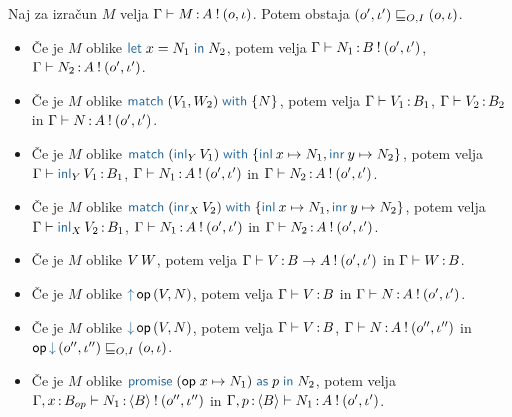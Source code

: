 \begin{lema}\label{lem:inversion-lema}
	Naj za izračun $M$ velja $\Gamma \vdash M \mathinner{:} A \mathbin{!} (o, \iota)$. Potem obstaja $(o', \iota') \sqsubseteq_{O, I} (o, \iota)$.
	\begin{itemize}
		\item Če je $M$ oblike $\tmlet{x}{N_1}{N_2}$, potem velja $\Gamma \vdash N_1 \mathinner{:} B \mathbin{!} (o', \iota')$, $\Gamma \vdash N_2 \mathinner{:} A \mathbin{!} (o', \iota')$.
	
		\item Če je $M$ oblike $\tmmatch{\tmpair{V_1}{W_2}}{N}$, potem velja $\Gamma \vdash V_1 \mathinner{:} B_1$, $\Gamma \vdash V_2 \mathinner{:} B_2$ in $\Gamma \vdash N \mathinner{:} A \mathbin{!} (o', \iota')$.
		
		\item Če je $M$ oblike $\tmmatch{(\tminl[Y]{V_1})}{\tminl{x} \mapsto N_1, \tminr{y} \mapsto N_2}$, potem velja $\Gamma \types \tminl[Y]{V_1} \of B_1$, $\Gamma \vdash N_1 \mathinner{:} A \mathbin{!} (o', \iota')$ in $\Gamma \vdash N_2 \mathinner{:} A \mathbin{!} (o', \iota')$.
		
		\item Če je $M$ oblike $\tmmatch{(\tminr[X]{V_2})}{\tminl{x} \mapsto N_1, \tminr{y} \mapsto N_2}$, potem velja $\Gamma \types \tminl[X]{V_2} \of B_1$, $\Gamma \vdash N_1 \mathinner{:} A \mathbin{!} (o', \iota')$ in $\Gamma \vdash N_2 \mathinner{:} A \mathbin{!} (o', \iota')$.
		
		\item Če je $M$ oblike $V\,W$, potem velja $\Gamma \vdash V \mathinner{:} B \to A \mathbin{!} (o', \iota')$ in $\Gamma \vdash W \mathinner{:} B$.
		
		\item Če je $M$ oblike $\tmopout{op}{V}{N}$, potem velja $\Gamma \vdash V \mathinner{:} B$ in $\Gamma \vdash N \mathinner{:} A \mathbin{!} (o', \iota')$.
		
		\item Če je $M$ oblike $\tmopin{op}{V}{N}$, potem velja $\Gamma \vdash V \mathinner{:} B$, $\Gamma \vdash N \mathinner{:} A \mathbin{!} (o'', \iota'')$ in $\opincomp{op}{(\o'', \i'')} \order{O, I} (\o, \i)$.
		
		\item Če je $M$ oblike $\tmwith{op}{x}{N_1}{p}{N_2}$, potem velja $\Gamma, x \mathinner{:} B_{op} \vdash N_1 \mathinner{:} \langle B \rangle \mathbin{!} (o'', \iota'')$ in $\Gamma, p \mathinner{:} \langle B \rangle \vdash N_1 \mathinner{:} A \mathbin{!} (o', \iota')$.
		
	\end{itemize}
\end{lema}

